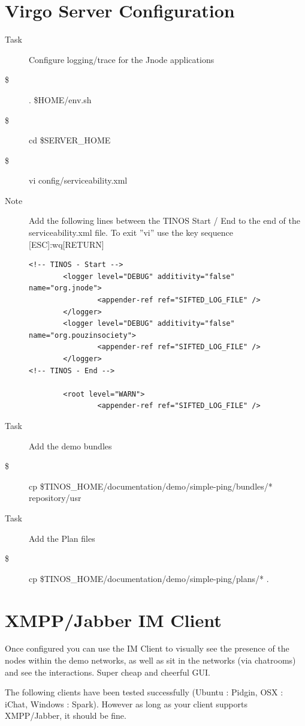 \section{Virgo Server Configuration}

\begin{description}
\item [Task] Configure logging/trace for the Jnode applications
\item [\$] . \$HOME/env.sh
\item [\$] cd \$SERVER\_HOME
\item [\$] vi config/serviceability.xml
\item [Note] Add the following lines between the TINOS Start / End to the end
of the serviceability.xml file. To exit ''vi'' use the key sequence [ESC]:wq[RETURN]
\begin{verbatim}
<!-- TINOS - Start -->
        <logger level="DEBUG" additivity="false" name="org.jnode">
                <appender-ref ref="SIFTED_LOG_FILE" />
        </logger>
        <logger level="DEBUG" additivity="false" name="org.pouzinsociety">
                <appender-ref ref="SIFTED_LOG_FILE" />
        </logger>
<!-- TINOS - End -->

        <root level="WARN">
                <appender-ref ref="SIFTED_LOG_FILE" />
\end{verbatim}
\item [Task] Add the demo bundles
\item [\$] cp \$TINOS\_HOME/documentation/demo/simple-ping/bundles/* repository/usr
\item [Task] Add the Plan files
\item [\$] cp \$TINOS\_HOME/documentation/demo/simple-ping/plans/* .
\end{description}

\section{XMPP/Jabber IM Client}
Once configured you can use the IM Client to visually see the presence of the nodes
within the demo networks, as well as sit in the networks (via chatrooms) and see the
interactions. Super cheap and cheerful GUI.

The following clients have been tested successfully (Ubuntu : Pidgin, OSX : iChat,
 Windows : Spark). However as long as your client supports XMPP/Jabber, it should be
fine.

